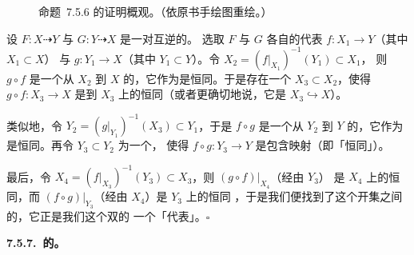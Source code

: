 \begin{figure}[htbp]
\centering
{\scriptsize
{}}
\caption{命题~7.5.6 的证明概观。（依原书手绘图重绘。）}
\label{fig:birational-proof-outline}
\end{figure}

设 $F\colon X\dashrightarrow Y$ 与 $G\colon Y\dashrightarrow X$ 是一对互逆的\trRationalMap{}。%
选取\trRationalMap{} $F$ 与 $G$ 各自的代表\trMorphism{} $f\colon X_1\to Y$（其中 $X_1\subset X$）%
与 $g\colon Y_1\to X$（其中 $Y_1\subset Y$）。令 $X_2=(f|_{X_1})^{-1}(Y_1)\subset X_1$，%
则 $g\circ f$ 是一个从 $X_2$ 到 $X$ 的\trMorphism，它作为\trRationalMap{}是恒同。于是存在一个%
\trDense\trOpenSubset{} $X_3\subset X_2$，使得\trMorphism{} $g\circ f\colon X_3\to X$ %
是到 $X_3$ 上的恒同\trMorphism（或者更确切地说，它是\trOpenEmbedding{}%
$X_3\hookrightarrow X$）。

类似地，令 $Y_2=(g|_{Y_1})^{-1}(X_3)\subset Y_1$，于是 $f\circ g$ 是一个从 $Y_2$ 到 $Y$ %
的\trMorphism，它作为\trRationalMap{}是恒同。再令 $Y_3\subset Y_2$ 为一个\trDense\trOpenSubset，%
使得 $f\circ g\colon Y_3\to Y$ 是包含映射（即「恒同」）。

最后，令 $X_4=(f|_{X_3})^{-1}(Y_3)\subset X_3$，则 $(g\circ f)|_{X_4}$（经由 $Y_3$）%
是 $X_4$ 上的恒同\trMorphism，而 $(f\circ g)|_{Y_3}$（经由 $X_4$）是 $Y_3$ 上的恒同%
\trMorphism，于是我们便找到了这个开集之间的\trIsomorphism，它正是我们这个双\trRationalMap{}的%
一个「代表」。\hfill$\square$

\textbf{7.5.7.\ \trIrreducible\trVariety{}的\trRationalMap{}。}

